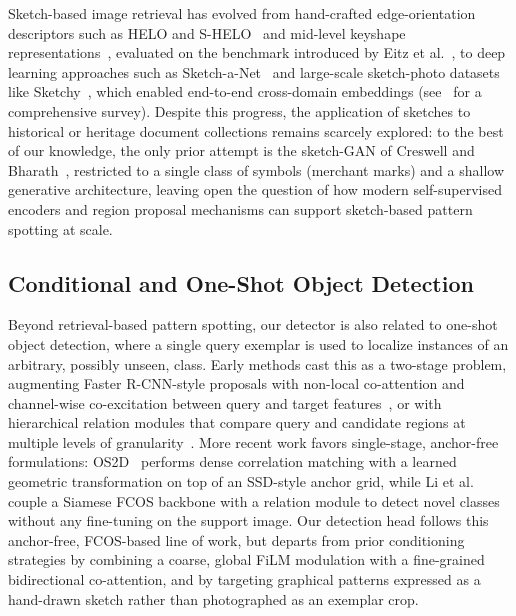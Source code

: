 \documentclass{iopjournal}
\begin{document}
Sketch-based image retrieval has evolved from hand-crafted edge-orientation descriptors such as HELO and S-HELO~\cite{saavedra2010helo,saavedra2014shelo} and mid-level keyshape representations~\cite{saavedra2015lks}, evaluated on the benchmark introduced by Eitz et al.~\cite{eitz2011benchmark,eitz2012sketch}, to deep learning approaches such as Sketch-a-Net~\cite{yu2017sketchanet} and large-scale sketch-photo datasets like Sketchy~\cite{sangkloy2016sketchy}, which enabled end-to-end cross-domain embeddings (see~\cite{xu2022freehand} for a comprehensive survey). Despite this progress, the application of sketches to historical or heritage document collections remains scarcely explored: to the best of our knowledge, the only prior attempt is the sketch-GAN of Creswell and Bharath~\cite{creswell2016sketchgan}, restricted to a single class of symbols (merchant marks) and a shallow generative architecture, leaving open the question of how modern self-supervised encoders and region proposal mechanisms can support sketch-based pattern spotting at scale.

\subsection{Conditional and One-Shot Object Detection}

Beyond retrieval-based pattern spotting, our detector is also related to one-shot object detection, where a single query exemplar is used to localize instances of an arbitrary, possibly unseen, class. Early methods cast this as a two-stage problem, augmenting Faster R-CNN-style proposals with non-local co-attention and channel-wise co-excitation between query and target features~\cite{hsieh2019coae}, or with hierarchical relation modules that compare query and candidate regions at multiple levels of granularity~\cite{yang2022bhrl}. More recent work favors single-stage, anchor-free formulations: OS2D~\cite{osokin2020os2d} performs dense correlation matching with a learned geometric transformation on top of an SSD-style anchor grid, while Li et al.~\cite{li2020matchingfcos} couple a Siamese FCOS backbone with a relation module to detect novel classes without any fine-tuning on the support image. Our detection head follows this anchor-free, FCOS-based line of work, but departs from prior conditioning strategies by combining a coarse, global FiLM modulation with a fine-grained bidirectional co-attention, and by targeting graphical patterns expressed as a hand-drawn sketch rather than photographed as an exemplar crop.
\end{document}
